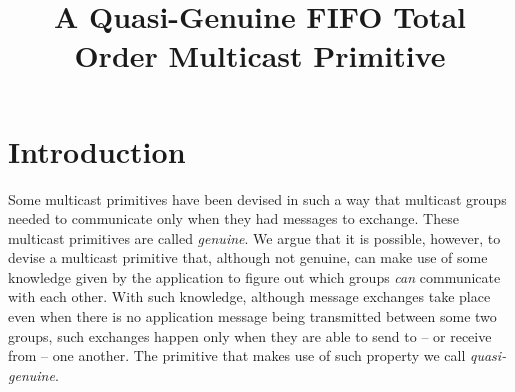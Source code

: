 \documentclass[times, 10pt]{article}
\begin{document}
\newcommand{\mv}[1]{\ensuremath{\operatorname{\mathit{#1}}}}
\newcommand{\bc}[1]{\textcolor{dark}{#1}}
\newtheorem{lems}{Lemma}
\newtheorem{props}{Proposition}
\newtheorem{thms}{Theorem}
\newtheorem{defs}{Definition}
\newtheorem{obs}{Observation}

\newcommand{\code}[1]{\texttt{\small{\textbf{#1}}}}

\newcommand{\blankline}{\vspace{4 mm}}
\newcommand{\cms}{\mbox{multicast}}
\newcommand{\cmd}{\mbox{deliver}}
\newcommand{\cmdel}[1]{\mbox{\cmd({#1})}}
\newcommand{\cmsend}[1]{\mbox{\cms({#1})}}
\newcommand{\tconsm}{T_{cons}}
\newcommand{\tcons}{\mbox{$\tconsm$}}
\newcommand{\opt}{\mbox{opt-deliver}}
\newcommand{\cons}{\mbox{deliver}}
\newcommand{\rmc}{\mbox{fifor-mcast}}
\newcommand{\rmd}{\mbox{fifor-deliver}}
\newcommand{\optdel}[1]{\mbox{\opt({#1})}}
\newcommand{\consdel}[1]{\mbox{\cons({#1})}}
\newcommand{\rmcast}[2]{\mbox{\rmc({#1},{#2})}}
\newcommand{\rmdel}[1]{\mbox{\rmd({#1})}}
 

\title{A Quasi-Genuine FIFO Total Order Multicast Primitive}


\maketitle

\begin{abstract}


\end{abstract}

\section{Introduction}
\label{sec:intro}

Some multicast primitives have been devised in such a way that multicast groups needed to communicate only when they had messages to exchange. These multicast primitives are called \emph{genuine}. We argue that it is possible, however, to devise a multicast primitive that, although not genuine, can make use of some knowledge given by the application to figure out which groups \emph{can} communicate with each other. With such knowledge, although message exchanges take place even when there is no application message being transmitted between some two groups, such exchanges happen only when they are able to send to -- or receive from -- one another. The primitive that makes use of such property we call \emph{quasi-genuine}. 
\end{document}
